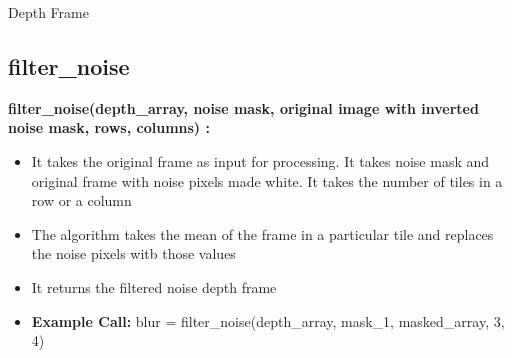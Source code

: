 \documentclass[10pt, a4paper]{beamer}
\begin{document}
\begin{frame}[allowframebreaks]{Depth Frame}
  \subsection{filter\_noise}
    \textbf{filter\_noise(depth\_array, noise mask, original image with inverted noise mask, rows, columns) : }
     \begin{itemize}
      \item It takes the original frame as input for processing. It takes noise mask and original frame with noise pixels made white. It takes the number of tiles in a row or a column
      \item The algorithm takes the mean of the frame in a particular tile and replaces the noise pixels witb those values
      \item It returns the filtered noise depth frame
      \item \textbf{Example Call:} blur = filter\_noise(depth\_array, mask\_1, masked\_array, 3, 4)
     \end{itemize}
\end{frame}
\end{document}

